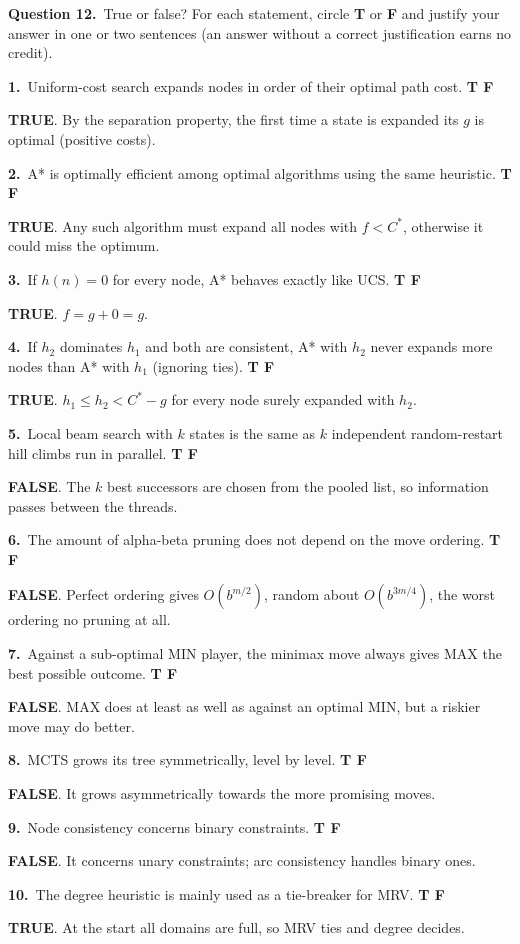 \documentclass[11pt,a4paper]{article}
\newcommand{\question}[1]{\par\medskip\noindent\textbf{Question #1.}\ }
\newcommand{\subq}[1]{\par\smallskip\noindent\textbf{#1}\ }
\newcommand{\T}{\textbf{\textcolor{green!45!black}{TRUE}}}
\newcommand{\F}{\textbf{\textcolor{red!70!black}{FALSE}}}
\begin{document}
\question{12}True or false?
For each statement, circle \textbf{T} or \textbf{F} and justify your answer in one or two sentences (an answer without a correct justification earns no credit).
\subq{1.}Uniform-cost search expands nodes in order of their optimal path cost. \hfill \textbf{T \quad F}
\begin{solbox}
\T. By the separation property, the first time a state is expanded its $g$ is optimal (positive costs).
\end{solbox}
\subq{2.}A* is optimally efficient among optimal algorithms using the same heuristic. \hfill \textbf{T \quad F}
\begin{solbox}
\T. Any such algorithm must expand all nodes with $f<C^*$, otherwise it could miss the optimum.
\end{solbox}
\subq{3.}If $h(n)=0$ for every node, A* behaves exactly like UCS. \hfill \textbf{T \quad F}
\begin{solbox}
\T. $f=g+0=g$.
\end{solbox}
\subq{4.}If $h_2$ dominates $h_1$ and both are consistent, A* with $h_2$ never expands more nodes than A* with $h_1$ (ignoring ties). \hfill \textbf{T \quad F}
\begin{solbox}
\T. $h_1\le h_2<C^*-g$ for every node surely expanded with $h_2$.
\end{solbox}
\subq{5.}Local beam search with $k$ states is the same as $k$ independent random-restart hill climbs run in parallel. \hfill \textbf{T \quad F}
\begin{solbox}
\F. The $k$ best successors are chosen from the pooled list, so information passes between the threads.
\end{solbox}
\subq{6.}The amount of alpha-beta pruning does not depend on the move ordering. \hfill \textbf{T \quad F}
\begin{solbox}
\F. Perfect ordering gives $O(b^{m/2})$, random about $O(b^{3m/4})$, the worst ordering no pruning at all.
\end{solbox}
\subq{7.}Against a sub-optimal MIN player, the minimax move always gives MAX the best possible outcome. \hfill \textbf{T \quad F}
\begin{solbox}
\F. MAX does at least as well as against an optimal MIN, but a riskier move may do better.
\end{solbox}
\subq{8.}MCTS grows its tree symmetrically, level by level. \hfill \textbf{T \quad F}
\begin{solbox}
\F. It grows asymmetrically towards the more promising moves.
\end{solbox}
\subq{9.}Node consistency concerns binary constraints. \hfill \textbf{T \quad F}
\begin{solbox}
\F. It concerns unary constraints; arc consistency handles binary ones.
\end{solbox}
\subq{10.}The degree heuristic is mainly used as a tie-breaker for MRV. \hfill \textbf{T \quad F}
\begin{solbox}
\T. At the start all domains are full, so MRV ties and degree decides.
\end{solbox}
\end{document}
